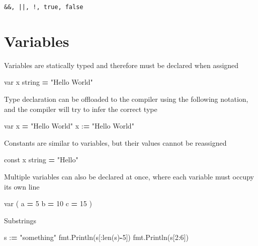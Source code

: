 \documentclass[]{book}
\newenvironment{Shaded}{\begin{snugshade}}{\end{snugshade}}
\newcommand{\DecValTok}[1]{\textcolor[rgb]{0.00,0.00,0.81}{#1}}
\newcommand{\StringTok}[1]{\textcolor[rgb]{0.31,0.60,0.02}{#1}}
\newcommand{\OperatorTok}[1]{\textcolor[rgb]{0.81,0.36,0.00}{\textbf{#1}}}
\newcommand{\BuiltInTok}[1]{#1}
\newcommand{\NormalTok}[1]{#1}
\begin{document}
\begin{verbatim}
&&, ||, !, true, false
\end{verbatim}

\section{Variables}\label{variables}

Variables are statically typed and therefore must be declared when
assigned

\begin{Shaded}
\begin{Highlighting}[]
\NormalTok{var x string }\OperatorTok{=} \StringTok{"Hello World"}
\end{Highlighting}
\end{Shaded}

Type declaration can be offloaded to the compiler using the following
notation, and the compiler will try to infer the correct type

\begin{Shaded}
\begin{Highlighting}[]
\NormalTok{var x }\OperatorTok{=} \StringTok{"Hello World"}
\NormalTok{x :}\OperatorTok{=} \StringTok{"Hello World"}
\end{Highlighting}
\end{Shaded}

Constants are similar to variables, but their values cannot be
reassigned

\begin{Shaded}
\begin{Highlighting}[]
\NormalTok{const x string }\OperatorTok{=} \StringTok{"Hello"}
\end{Highlighting}
\end{Shaded}

Multiple variables can also be declared at once, where each variable
must occupy its own line

\begin{Shaded}
\begin{Highlighting}[]
\NormalTok{var (}
\NormalTok{    a }\OperatorTok{=} \DecValTok{5}
\NormalTok{    b }\OperatorTok{=} \DecValTok{10}
\NormalTok{    c }\OperatorTok{=} \DecValTok{15}
\NormalTok{)}
\end{Highlighting}
\end{Shaded}

Substrings

\begin{Shaded}
\begin{Highlighting}[]
\NormalTok{s :}\OperatorTok{=} \StringTok{"something"}
\NormalTok{fmt.Println(s[:}\BuiltInTok{len}\NormalTok{(s)}\OperatorTok{-}\DecValTok{5}\NormalTok{])}
\NormalTok{fmt.Println(s[}\DecValTok{2}\NormalTok{:}\DecValTok{6}\NormalTok{])}
\end{Highlighting}
\end{Shaded}
\end{document}
